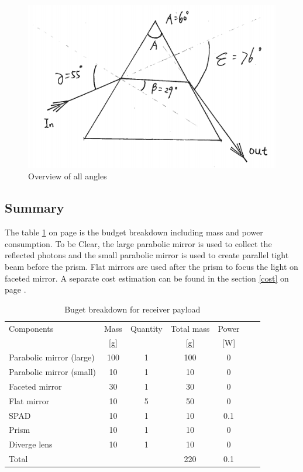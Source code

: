 \begin{figure}[ht!]
\centering
\includegraphics[scale = 0.8]{chapters/img/prism_final.png}
\caption{Overview of all angles}
\label{fig:prism_final}
\end{figure}

\subsection{Summary}
\label{sum}
The table \ref{tab:receiverbudget} on page \pageref{tab:receiverbudget} is the budget breakdown including mass and power consumption. To be Clear, the large parabolic mirror is used to collect the reflected photons and the small parabolic mirror is used to create parallel tight beam before the prism. Flat mirrors are used after the prism to focus the light on faceted mirror. A separate cost estimation can be found in the section \ref{cost} on page \pageref{cost}.

\begin{table}[ht!]
\centering
\begin{tabular}{l | c | c c | c c | c }
Components                & Mass  & Quantity & Total mass & Power\\ 
                          &  [g]  &          &     [g]    &  [W] \\\hline\hline
Parabolic mirror (large)  &  100  &     1    &     100    &   0   \\
Parabolic mirror (small)  &  10   &     1    &     10     &   0   \\
Faceted mirror            &  30   &     1    &     30     &   0   \\ 
Flat mirror               &  10   &     5    &     50     &   0   \\
\acs{SPAD}                &  10   &     1    &     10     &   0.1 \\
Prism                     &  10   &     1    &     10     &   0   \\ 
Diverge lens              &  10   &     1    &     10     &   0   \\ \hline
Total                     &       &          &     220    &   0.1 \\
\end{tabular}
\caption{Buget breakdown for receiver payload}
\label{tab:receiverbudget}
\end{table}


